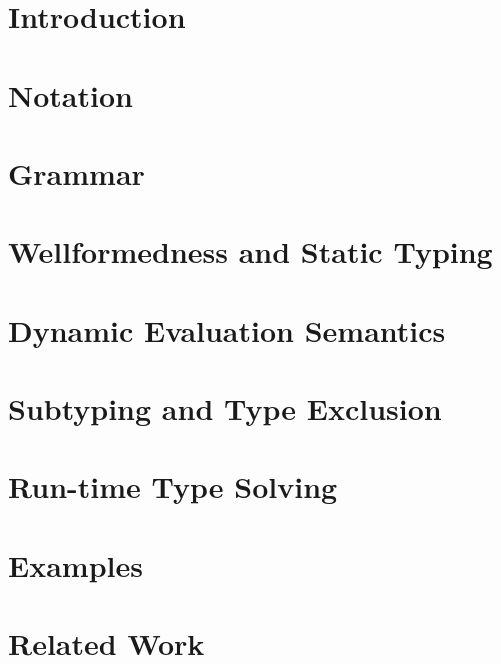 \documentclass[10pt]{sigplanconf}
\begin{document}


\section{Introduction}
\label{sec:introduction}
%

\newpage

\section{Notation}
\label{sec:notation}


\section{Grammar}
\label{sec:grammar}


\section{Wellformedness and Static Typing}
\label{sec:static}


\section{Dynamic Evaluation Semantics}
\label{sec:evaluation}


\section{Subtyping and Type Exclusion}
\label{sec:subtyping}



\section{Run-time Type Solving}
\label{sec:solving}
%

\section{Examples}
\label{sec:examples}
%

\section{Related Work}\label{sec:related}
%
\end{document}
